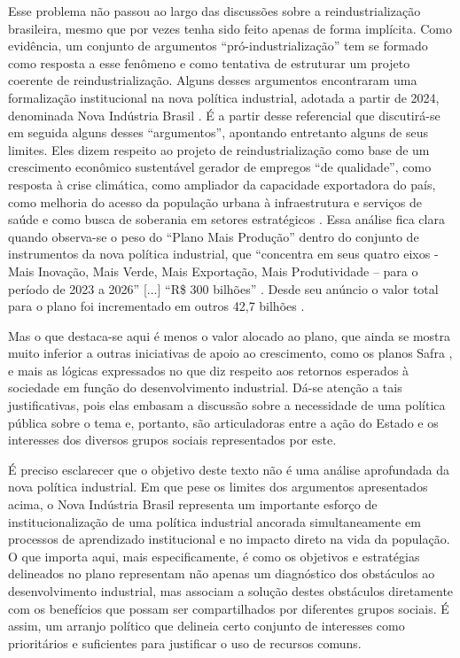 Esse problema não passou ao largo das discussões sobre a
reindustrialização brasileira, mesmo que por vezes tenha sido feito
apenas de forma implícita. Como evidência, um conjunto de argumentos
``pró-industrialização'' tem se formado como resposta a esse fenômeno e
como tentativa de estruturar um projeto coerente de reindustrialização.
Alguns desses argumentos encontraram uma formalização institucional na
nova política industrial, adotada a partir de 2024, denominada Nova
Indústria Brasil \citep{cndi_nova_2024}. É a partir desse referencial que
discutirá-se em seguida alguns desses ``argumentos'', apontando
entretanto alguns de seus limites. Eles dizem respeito ao projeto de
reindustrialização como base de um crescimento econômico sustentável
gerador de empregos ``de qualidade'', como resposta à crise climática,
como ampliador da capacidade exportadora do país, como melhoria do
acesso da população urbana à infraestrutura e serviços de saúde e como
busca de soberania em setores estratégicos \citep{cndi_nova_2024}. Essa
análise fica clara quando observa-se o peso do ``Plano Mais Produção''
dentro do conjunto de instrumentos da nova política industrial, que
``concentra em seus quatro eixos - Mais Inovação, Mais Verde, Mais
Exportação, Mais Produtividade -- para o período de 2023 a 2026''
{[}...{]} ``R\$ 300 bilhões'' \citep[p.~14]{cndi_nova_2024}. Desde seu
anúncio o valor total para o plano foi incrementado em outros 42,7
bilhões .

Mas o que destaca-se aqui é menos o valor alocado ao plano, que ainda se
mostra muito inferior a outras iniciativas de apoio ao crescimento, como
os planos Safra , e mais as lógicas expressados no
que diz respeito aos retornos esperados à sociedade em função do
desenvolvimento industrial. Dá-se atenção a tais justificativas, pois
elas embasam a discussão sobre a necessidade de uma política pública
sobre o tema e, portanto, são articuladoras entre a ação do Estado e os
interesses dos diversos grupos sociais representados por este.

É preciso esclarecer que o objetivo deste texto não é uma análise
aprofundada da nova política industrial. Em que pese os limites dos
argumentos apresentados acima, o Nova Indústria Brasil representa um
importante esforço de institucionalização de uma política industrial
ancorada simultaneamente em processos de aprendizado institucional e no
impacto direto na vida da população. O que importa aqui, mais
especificamente, é como os objetivos e estratégias delineados no plano
representam não apenas um diagnóstico dos obstáculos ao desenvolvimento
industrial, mas associam a solução destes obstáculos diretamente com os
benefícios que possam ser compartilhados por diferentes grupos sociais.
É assim, um arranjo político que delineia certo conjunto de interesses
como prioritários e suficientes para justificar o uso de recursos
comuns.

